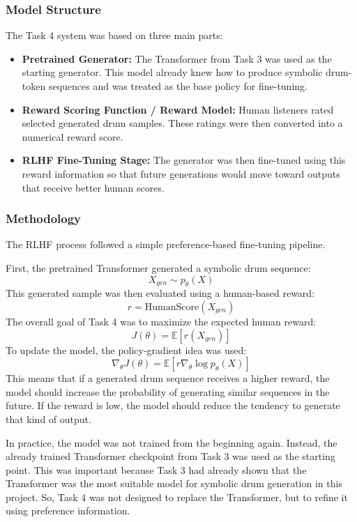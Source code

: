 \documentclass[conference]{IEEEtran}
\begin{document}
\subsubsection{Model Structure}
The Task 4 system was based on three main parts:
\begin{itemize}
    \item \textbf{Pretrained Generator:} The Transformer from Task 3 was used as the starting generator. This model already knew how to produce symbolic drum-token sequences and was treated as the base policy for fine-tuning.
    \item \textbf{Reward Scoring Function / Reward Model:} Human listeners rated selected generated drum samples. These ratings were then converted into a numerical reward score.
    \item \textbf{RLHF Fine-Tuning Stage:} The generator was then fine-tuned using this reward information so that future generations would move toward outputs that receive better human scores.
\end{itemize}

\subsubsection{Methodology}
The RLHF process followed a simple preference-based fine-tuning pipeline.

First, the pretrained Transformer generated a symbolic drum sequence:
\[
X_{gen} \sim p_{\theta}(X)
\]
This generated sample was then evaluated using a human-based reward:
\[
r = \text{HumanScore}(X_{gen})
\]
The overall goal of Task 4 was to maximize the expected human reward:
\[
J(\theta) = \mathbb{E}[r(X_{gen})]
\]
To update the model, the policy-gradient idea was used:
\[
\nabla_{\theta}J(\theta) = \mathbb{E}[r \nabla_{\theta} \log p_{\theta}(X)]
\]
This means that if a generated drum sequence receives a higher reward, the model should increase the probability of generating similar sequences in the future. If the reward is low, the model should reduce the tendency to generate that kind of output.

In practice, the model was not trained from the beginning again. Instead, the already trained Transformer checkpoint from Task 3 was used as the starting point. This was important because Task 3 had already shown that the Transformer was the most suitable model for symbolic drum generation in this project. So, Task 4 was not designed to replace the Transformer, but to refine it using preference information.
\end{document}
